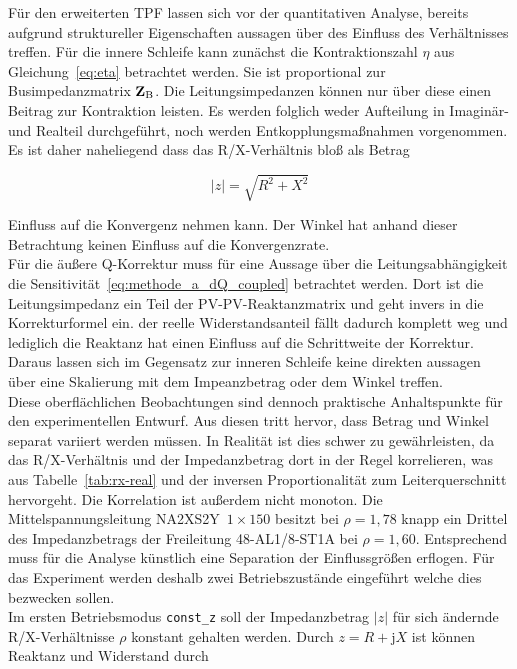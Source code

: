 Für den erweiterten TPF lassen sich vor der quantitativen Analyse, bereits aufgrund struktureller Eigenschaften aussagen über des Einfluss des Verhältnisses treffen.
Für die innere Schleife kann zunächst die Kontraktionszahl $\eta$ aus Gleichung~\eqref{eq:eta} betrachtet werden. 
Sie ist proportional zur Busimpedanzmatrix $\mathbf{Z}_\mathrm{B}$.
Die Leitungsimpedanzen können nur über diese einen Beitrag zur Kontraktion leisten.
Es werden folglich weder Aufteilung in Imaginär- und Realteil durchgeführt, noch werden Entkopplungsmaßnahmen vorgenommen.
Es ist daher naheliegend dass das R/X-Verhältnis bloß als Betrag

\begin{equation}
	\lvert z\rvert=\sqrt{R^{2}+X^{2}}
\end{equation}

Einfluss auf die Konvergenz nehmen kann. 
Der Winkel hat anhand dieser Betrachtung keinen Einfluss auf die Konvergenzrate.\\

Für die äußere Q-Korrektur muss für eine Aussage über die Leitungsabhängigkeit die Sensitivität~\eqref{eq:methode_a_dQ_coupled} betrachtet werden.
Dort ist die Leitungsimpedanz ein Teil der PV-PV-Reaktanzmatrix und geht invers in die Korrekturformel ein.
der reelle Widerstandsanteil fällt dadurch komplett weg und lediglich die Reaktanz hat einen Einfluss auf die Schrittweite der Korrektur.
Daraus lassen sich im Gegensatz zur inneren Schleife keine direkten aussagen über eine Skalierung mit dem Impeanzbetrag oder dem Winkel treffen.\\

Diese oberflächlichen Beobachtungen sind dennoch praktische Anhaltspunkte für den experimentellen Entwurf.
Aus diesen tritt hervor, dass Betrag und Winkel separat variiert werden müssen. 
In Realität ist dies schwer zu gewährleisten, da das R/X-Verhältnis und der Impedanzbetrag dort in der Regel korrelieren, was aus Tabelle~\ref{tab:rx-real} und der inversen Proportionalität zum Leiterquerschnitt hervorgeht. 
Die Korrelation ist außerdem nicht monoton.
Die Mittelspannungsleitung NA2XS2Y~$1\times150$ besitzt bei $\rho=1{,}78$ knapp ein
Drittel des Impedanzbetrags der Freileitung 48-AL1/8-ST1A bei $\rho=1{,}60$.
Entsprechend muss für die Analyse künstlich eine Separation der Einflussgrößen erflogen.
Für das Experiment werden deshalb zwei Betriebszustände eingeführt welche dies bezwecken sollen.\\

Im ersten Betriebsmodus  \texttt{const\_z} soll der Impedanzbetrag $\lvert z\rvert$ für sich ändernde R/X-Verhältnisse $\rho$ konstant gehalten werden. 
Durch $z = R + \mathrm{j}X$ ist können Reaktanz und Widerstand durch 

